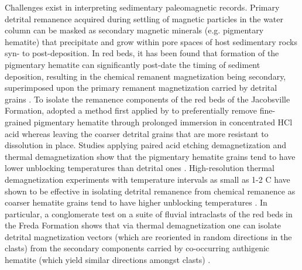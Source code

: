 \documentclass[draft]{agujournal2019}
\begin{document}
Challenges exist in interpreting sedimentary paleomagnetic records. Primary detrital remanence acquired during settling of magnetic particles in the water column can be masked as secondary magnetic minerals (e.g. pigmentary hematite) that precipitate and grow within pore spaces of host sedimentary rocks syn- to post-deposition. In red beds, it has been found that formation of the pigmentary hematite can significantly post-date the timing of sediment deposition, resulting in the chemical remanent magnetization being secondary, superimposed upon the primary remanent magnetization carried by detrital grains \cite{Butler1992a}. To isolate the remanence components of the red beds of the Jacobsville Formation,  adopted a method first applied by  to preferentially remove fine-grained pigmentary hematite through prolonged immersion in concentrated HCl acid whereas leaving the coarser detrital grains that are more resistant to dissolution in place. Studies applying paired acid etching demagnetization and thermal demagnetization show that the pigmentary hematite grains tend to have lower unblocking temperatures than detrital ones \cite{Tauxe1980a, Bilardello2010c}. High-resolution thermal demagnetization experiments with temperature intervals as small as 1-2 \textdegree C have shown to be effective in isolating detrital remanence from chemical remanence as coarser hematite grains tend to have higher unblocking temperatures \cite{Swanson-Hysell2019b}. In particular, a conglomerate test on a suite of fluvial intraclasts of the red beds in the Freda Formation shows that via thermal demagnetization one can isolate detrital magnetization vectors (which are reoriented in random directions in the clasts) from the secondary components carried by co-occurring authigenic hematite (which yield similar directions amongst clasts) \cite{Swanson-Hysell2019b}. 
\end{document}
